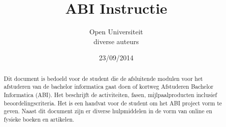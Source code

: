 \documentclass[a4paper,11pt,twoside,final]{article}
\author{Open Universiteit\\ diverse auteurs}
\title{ABI Instructie}
\date{23/09/2014}
\begin{document}


\maketitle

\begin{abstract}
    Dit document is bedoeld voor de student die de afsluitende modulen
    voor het afstuderen van de bachelor informatica gaat doen of kortweg
    Afstuderen Bachelor Informatica (ABI). Het beschrijft de activiteiten,
    fasen, mijlpaalproducten inclusief beoordelingscriteria. Het is een handvat
    voor de student om het ABI project vorm te geven. Naast dit document zijn
    er diverse hulpmiddelen in de vorm van online en fysieke boeken en artikelen.
\end{abstract}

\tableofcontents









\end{document}
